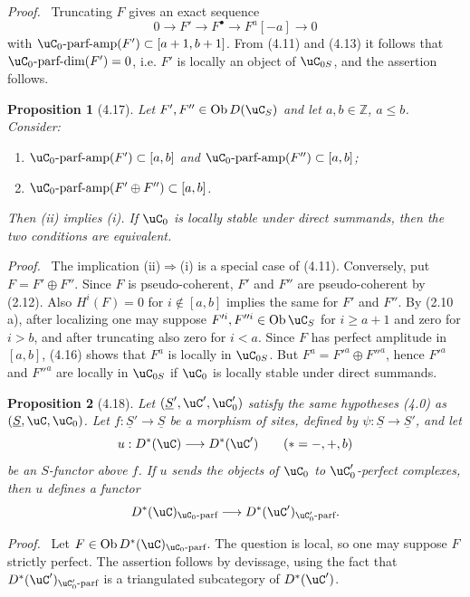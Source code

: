 \documentclass[11pt]{article}
\theoremstyle{plain}
\newtheorem*{proposition*}{Proposition}
\theoremstyle{definition}
\theoremstyle{remark}
\newenvironment{prooftext}{\par\noindent\textit{Proof.}\ }{\par\medskip}
\newcommand{\ZZ}{\mathbb Z}
\DeclareMathOperator{\ob}{Ob}
\providecommand{\uS}{\underline{S}}
\begin{document}
\begin{prooftext}
Truncating $F$ gives an exact sequence
\[
0\longrightarrow F'\longrightarrow F^\bullet\longrightarrow F^a[-a]\longrightarrow0
\]
with $\uC_0\text{-parf-amp}(F')\subset[a+1,b+1]$. From (4.11) and (4.13) it follows that $\uC_0\text{-parf-dim}(F')=0$, i.e. $F'$ is locally an object of $\uC_{0S}$, and the assertion follows.
\end{prooftext}

\begin{proposition*}[4.17]
Let $F',F''\in\ob D(\uC_S)$ and let $a,b\in\ZZ$, $a\leq b$. Consider:
\begin{enumerate}[label=(\roman*)]
\item $\uC_0\text{-parf-amp}(F')\subset[a,b]$ and $\uC_0\text{-parf-amp}(F'')\subset[a,b]$;
\item $\uC_0\text{-parf-amp}(F'\oplus F'')\subset[a,b]$.
\end{enumerate}
Then (ii) implies (i). If $\uC_0$ is locally stable under direct summands, then the two conditions are equivalent.
\end{proposition*}

\begin{prooftext}
The implication (ii)$\Rightarrow$(i) is a special case of (4.11). Conversely, put $F=F'\oplus F''$. Since $F$ is pseudo-coherent, $F'$ and $F''$ are pseudo-coherent by (2.12). Also $H^i(F)=0$ for $i\notin[a,b]$ implies the same for $F'$ and $F''$. By (2.10 a), after localizing one may suppose $F'^i,F''^i\in\ob\uC_S$ for $i\geq a+1$ and zero for $i>b$, and after truncating also zero for $i<a$. Since $F$ has perfect amplitude in $[a,b]$, (4.16) shows that $F^a$ is locally in $\uC_{0S}$. But $F^a=F'^a\oplus F''^a$, hence $F'^a$ and $F''^a$ are locally in $\uC_{0S}$ if $\uC_0$ is locally stable under direct summands.
\end{prooftext}

\begin{proposition*}[4.18]
Let $(\uS',\uC',\uC'_0)$ satisfy the same hypotheses (4.0) as $(\uS,\uC,\uC_0)$. Let $f:\uS'\to\uS$ be a morphism of sites, defined by $\psi:\uS\to\uS'$, and let
\[
u:D^*(\uC)\longrightarrow D^*(\uC')\qquad (*=-,+,b)
\]
be an $S$-functor above $f$. If $u$ sends the objects of $\uC_0$ to $\uC'_0$-perfect complexes, then $u$ defines a functor
\[
D^*(\uC)_{\uC_0\text{-parf}}
\longrightarrow
D^*(\uC')_{\uC'_0\text{-parf}}.
\]
\end{proposition*}

\begin{prooftext}
Let $F\in\ob D^*(\uC)_{\uC_0\text{-parf}}$. The question is local, so one may suppose $F$ strictly perfect. The assertion follows by devissage, using the fact that $D^*(\uC')_{\uC'_0\text{-parf}}$ is a triangulated subcategory of $D^*(\uC')$.
\end{prooftext}
\end{document}
